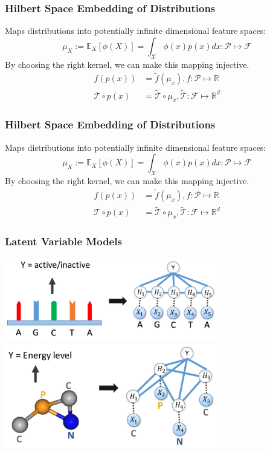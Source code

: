 \documentclass{beamer}
\begin{document}
    \begin{frame}
        \frametitle{Hilbert Space Embedding of Distributions}
        Maps distributions into potentially infinite dimensional feature spaces:
        \begin{equation}
            \mu_X := \mathbb{E}_X[\phi(X)] = \int_{\mathcal X} \phi(x)p(x)dx : \mathcal P \mapsto \mathcal F
        \end{equation}
        By choosing the right kernel, we can make this mapping injective.
        \begin{align}
            f(p(x)) &= \tilde{f}(\mu_x), f:\mathcal P \mapsto \mathbb R\\
            \mathcal{T} \circ p(x) &= \tilde{\mathcal T} \circ \mu_x, \tilde{\mathcal T}: \mathcal F \mapsto \mathbb R^d
        \end{align}
    \end{frame}

    \begin{frame}
        \frametitle{Hilbert Space Embedding of Distributions}
        Maps distributions into potentially infinite dimensional feature spaces:
        \begin{equation}
            \mu_X := \mathbb{E}_X[\phi(X)] = \int_{\mathcal X} \phi(x)p(x)dx : \mathcal P \mapsto \mathcal F
        \end{equation}
        By choosing the right kernel, we can make this mapping injective.
        \begin{align}
            f(p(x)) &= \tilde{f}(\mu_x), f:\mathcal P \mapsto \mathbb R\\
            \mathcal{T} \circ p(x) &= \tilde{\mathcal T} \circ \mu_x, \tilde{\mathcal T}: \mathcal F \mapsto \mathbb R^d
        \end{align}
    \end{frame}

    \begin{frame}
        \frametitle{Latent Variable Models}
        \begin{center}
            \includegraphics[width=0.7\textwidth]{string_lvm.png}
            \includegraphics[width=0.7\textwidth]{graph_lvm.png}
        \end{center}
    \end{frame}
\end{document}
